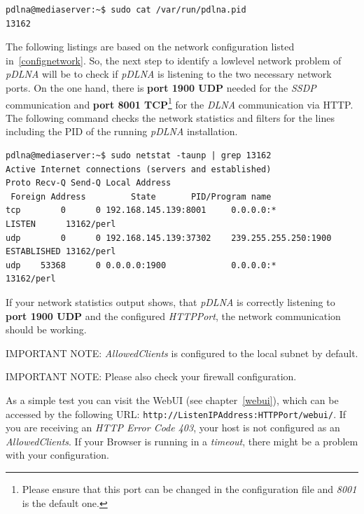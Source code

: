 \documentclass[a4paper,oneside,10pt]{report}
\newenvironment{colframeimportantnote}{%
  \begin{Sbox}
    \begin{minipage}{.99\columnwidth}
}{%
  \end{minipage}
  \end{Sbox}
  \begin{center}
    \fcolorbox{black}{Orange}{\TheSbox}
  \end{center}
}
\begin{document}
\begin{lstlisting}
pdlna@mediaserver:~$ sudo cat /var/run/pdlna.pid
13162
\end{lstlisting}

The following listings are based on the network configuration listed in~\ref{confignetwork}. So, the next step to identify a lowlevel network problem of {\em pDLNA} will be to check if {\em pDLNA} is listening to the two necessary network ports. On the one hand, there is \textbf{port 1900 UDP} needed for the {\em SSDP} communication and \textbf{port 8001 TCP}\footnote{Please ensure that this port can be changed in the configuration file and {\em 8001} is the default one.} for the {\em DLNA} communication via HTTP. The following command checks the network statistics and filters for the lines including the PID of the running {\em pDLNA} installation.
\begin{lstlisting}
pdlna@mediaserver:~$ sudo netstat -taunp | grep 13162
Active Internet connections (servers and established)
Proto Recv-Q Send-Q Local Address
 Foreign Address         State       PID/Program name
tcp        0      0 192.168.145.139:8001     0.0.0.0:*               LISTEN      13162/perl
udp        0      0 192.168.145.139:37302    239.255.255.250:1900    ESTABLISHED 13162/perl
udp    53368      0 0.0.0.0:1900             0.0.0.0:*                           13162/perl
\end{lstlisting}
If your network statistics output shows, that {\em pDLNA} is correctly listening to \textbf{port 1900 UDP} and the configured {\em HTTPPort}, the network communication should be working.

\begin{colframeimportantnote}
\textsc{IMPORTANT NOTE:} {\em AllowedClients} is configured to the local subnet by default.
\end{colframeimportantnote}

\begin{colframeimportantnote}
\textsc{IMPORTANT NOTE:} Please also check your firewall configuration.
\end{colframeimportantnote}

As a simple test you can visit the WebUI (see chapter~\ref{webui}), which can be accessed by the following URL: \verb|http://ListenIPAddress:HTTPPort/webui/|. If you are receiving an {\em HTTP Error Code 403}, your host is not configured as an {\em AllowedClients}. If your Browser is running in a {\em timeout}, there might be a problem with your configuration.
\end{document}
